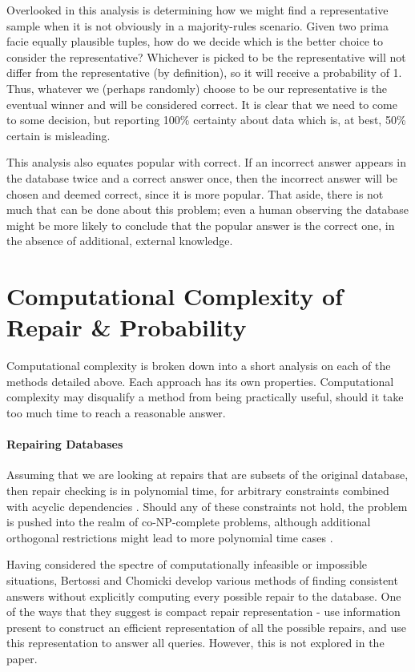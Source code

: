 \documentclass[a4paper]{report}
\begin{document}
Overlooked in this analysis is determining how we might find a representative sample when it is not obviously in a majority-rules scenario. Given two prima facie equally plausible tuples, how do we decide which is the better choice to consider the representative? Whichever is picked to be the representative will not differ from the representative (by definition), so it will receive a probability of 1. Thus, whatever we (perhaps randomly) choose to be our representative is the eventual winner and will be considered correct. It is clear that we need to come to some decision, but reporting 100\% certainty about data which is, at best, 50\% certain is misleading. 

This analysis also equates popular with correct. If an incorrect answer appears in the database twice and a correct answer once, then the incorrect answer will be chosen and deemed correct, since it is more popular. That aside, there is not much that can be done about this problem; even a human observing the database might be more likely to conclude that the popular answer is the correct one, in the absence of additional, external knowledge.

\section*{Computational Complexity of Repair \& Probability}
Computational complexity is broken down into a short analysis on each of the methods detailed above. Each approach has its own properties. Computational complexity may disqualify a method from being practically useful, should it take too much time to reach a reasonable answer.

\paragraph{Repairing Databases}
Assuming that we are looking at repairs that are subsets of the original database, then repair checking is in polynomial time, for arbitrary constraints combined with acyclic dependencies \cite{CQ}. Should any of these constraints not hold, the problem is pushed into the realm of co-NP-complete problems, although additional orthogonal restrictions might lead to more polynomial time cases \cite{CQ}.

Having considered the spectre of computationally infeasible or impossible situations, Bertossi and Chomicki \cite{CQ} develop various methods of finding consistent answers without explicitly computing every possible repair to the database. One of the ways that they suggest is compact repair representation - use information present to construct an efficient representation of all the possible repairs, and use this representation to answer all queries. However, this is not explored in the paper.
\end{document}
